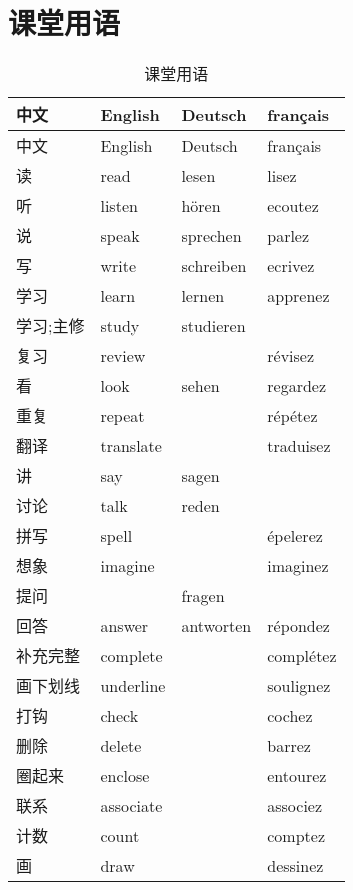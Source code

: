 \documentclass[12pt,A4paper,oneside,reqno]{amsart}
\numberwithin{equation}{section}
\theoremstyle{plain}
\theoremstyle{plain}
\theoremstyle{plain}
\numberwithin{equation}{section}
\theoremstyle{remark}
\begin{document}
\section{课堂用语}
\begin{longtable}{|l|l|l|l|}
	\hline
中文	&	English	&	Deutsch	&	français	\\							
	\hline
	\endhead
	\hline
中文	&	English	&	Deutsch	&	français	\\							
	\hline
	\endfirsthead	
	\hline
	\endfoot
	\hline
	\caption{课堂用语}
	\endlastfoot				
							
读	&	read	&	lesen	&	lisez	\\
听	&	listen	&	h\"{o}ren	&	ecoutez	\\
说	&	speak	&	sprechen	&	parlez	\\
写	&	write	&	schreiben	&	ecrivez	\\
\hline							
学习	&	learn	&	lernen	&	apprenez	\\
学习;主修	&	study	&	studieren	&		\\
复习	&	review	&		&	r\'{e}visez	\\
看	&	look	&	sehen	&	regardez	\\
重复	&	repeat	&		&	r\'{e}p\'{e}tez	\\
翻译	&	translate	&		&	traduisez	\\
讲	&	say	&	sagen	&		\\
讨论	&	talk	&	reden	&		\\
拼写	&	spell	&		&	\'{e}pelerez	\\
想象	&	imagine	&		&	imaginez	\\
提问	&		&	fragen	&		\\
回答	&	answer	&	antworten	&	r\'{e}pondez	\\
\hline							
补充完整	&	complete	&		&	compl\'{e}tez	\\
画下划线	&	underline	&		&	soulignez	\\
打钩	&	check	&		&	cochez	\\
删除	&	delete	&		&	barrez	\\
圈起来	&	enclose	&		&	entourez	\\
联系	&	associate	&		&	associez	\\
计数	&	count	&		&	comptez	\\
画	&	draw	&		&	dessinez	\\


\end{longtable}
\end{document}
